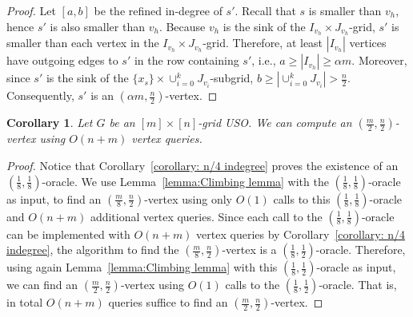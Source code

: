 \documentclass[a4paper,10pt]{article}
\newtheorem{corollary}{Corollary}
\newcommand{\indegree}{refined in-degree\xspace}
\begin{document}
\begin{proof}
Let $[a,b]$ be the \indegree of $s'$.
Recall that $s$ is smaller than $v_h$, hence $s'$ is also smaller than $v_h$.
Because $v_h$ is the sink of the $I_{v_h}\times J_{v_h}$-grid, $s'$ is smaller than each vertex in the $I_{v_h}\times J_{v_h}$-grid.
Therefore, at least $|I_{v_h}|$ vertices have outgoing edges to $s'$ in the row containing $s'$, i.e., $a\geq |I_{v_h}| \geq \alpha m$.
Moreover, since $s'$ is the sink of the $\{x_s\}\times \cup_{i=0}^k J_{v_i}$-subgrid, $b \geq |\cup_{i=0}^k J_{v_i}|  >  \frac{n}{2}$.
Consequently, $s'$ is an $(\alpha m,  \frac{n}{2})$-vertex.
\end{proof}

\begin{corollary}\label{corollary: (m/2,n/2) indegree}
Let $G$ be an $[m]\times [n]$-grid USO. 
We can compute an $( \frac{m}{2}, \frac{n}{2})$-vertex using $O(n + m)$ vertex queries.
\end{corollary}
\begin{proof}
Notice that Corollary~\ref{corollary: n/4 indegree} proves the existence of an $( \frac{1}{8}, \frac{1}{8})$-oracle.
We use Lemma~\ref{lemma:Climbing lemma} with the $(\frac{1}{8}, \frac{1}{8})$-oracle as input, to find an $(\frac{m}{8}, \frac{n}{2})$-vertex using only $O(1)$ calls to this $(\frac{1}{8}, \frac{1}{8})$-oracle and $O(n+m)$ additional vertex queries. Since each call to the  $(\frac{1}{8}, \frac{1}{8})$-oracle can be implemented with $O(n+m)$ vertex queries by Corollary~\ref{corollary: n/4 indegree}, the algorithm to find the $(\frac{m}{8}, \frac{n}{2})$-vertex is a $(\frac{1}{8}, \frac{1}{2})$-oracle. 
Therefore, using again Lemma~\ref{lemma:Climbing lemma} with this $(\frac{1}{8}, \frac{1}{2})$-oracle as input, we can find an $(\frac{m}{2}, \frac{n}{2})$-vertex using $O(1)$ calls to the $(\frac{1}{8}, \frac{1}{2})$-oracle. That is, in total $O(n + m)$ queries suffice to find an $(\frac{m}{2}, \frac{n}{2})$-vertex.
\end{proof}
\end{document}

